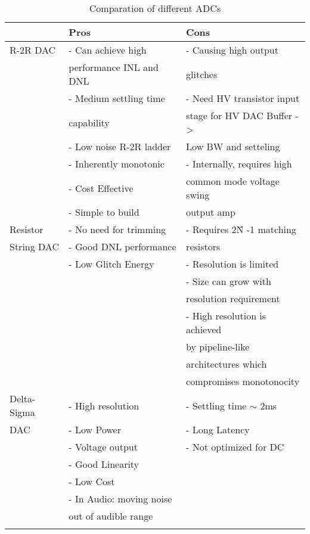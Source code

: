 \documentclass[english, 12pt, a4paper]{article}
\begin{document}
\begin{table}[!ht]
  \centering
 \begin{tabular}{|l|l|l|}
 \hline
			& Pros       			& Cons   			\\ \hline
R-2R DAC 		& - Can achieve high		& - Causing high output 	\\
			& performance INL and DNL	& glitches		   	\\ 
			& - Medium settling time	& - Need HV transistor input	\\
			& capability			&  stage for HV DAC Buffer ->	\\
			& - Low noise R-2R ladder	&  Low BW and setteling		\\
			& - Inherently monotonic	& - Internally, requires high 	\\
			& - Cost Effective		& common mode voltage swing 	\\
			& - Simple to build 		& output amp		 	\\ \hline
Resistor		& - No need for trimming	& - Requires 2\^N -1 matching 	\\
String DAC		& - Good DNL performance	& resistors			\\
			& - Low Glitch Energy		& - Resolution is limited	\\ 
			& 				& - Size can grow with 		\\
			&				& resolution requirement	\\
			& 				& - High resolution is achieved \\
			&				& by pipeline-like		\\
			& 				& architectures which 		\\
			&				& compromises monotonocity	\\ \hline
Delta-Sigma		& - High resolution		& - Settling time \(\sim\) 2ms	\\
DAC			& - Low Power			& - Long Latency		\\
			& - Voltage output		& -  Not optimized for DC	\\
			& - Good Linearity		&				\\
			& - Low Cost			&				\\
			& - In Audio: moving noise	&				\\
			& out of audible range		&				\\ \hline
 		        &     				& 				\\ \hline
 \end{tabular}
 \caption{Comparation of different ADCs}
 \label{dac:comparison}
 \end{table}
 
\end{document}
